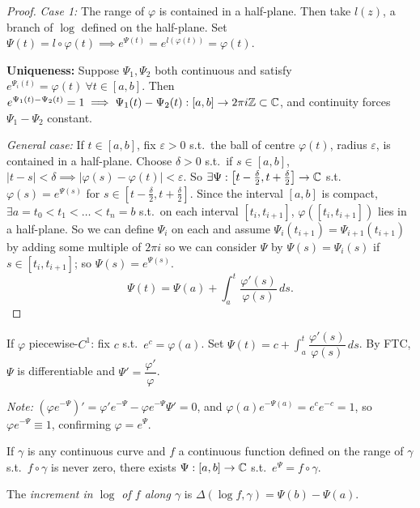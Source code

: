 \documentclass[11pt]{article}
\begin{document}
\begin{proof}
\emph{Case 1:} The range of $\varphi$ is contained in a half-plane. Then take $l(z)$, a branch of $\log$ defined on the half-plane. Set $\Psi(t) = l\circ\varphi(t) \implies e^{\Psi(t)} = e^{l(\varphi(t))} = \varphi(t)$.

\textbf{Uniqueness:} Suppose $\Psi_1,\Psi_2$ both continuous and satisfy $e^{\Psi_i(t)}=\varphi(t)\ \forall t\in[a,b]$. Then $e^{\Psi_1(t)-\Psi_2(t)}=1 \implies \Psi_1(t)-\Psi_2(t) : [a,b]\to 2\pi i{\mathbb{Z}}\subset{\mathbb{C}}$, and continuity forces $\Psi_1-\Psi_2$ constant.

\emph{General case:} If $t\in[a,b]$, fix $\varepsilon>0$ s.t.\ the ball of centre $\varphi(t)$, radius $\varepsilon$, is contained in a half-plane. Choose $\delta>0$ s.t.\ if $s\in[a,b]$, $|t-s|<\delta \implies |\varphi(s)-\varphi(t)|<\varepsilon$. So $\exists \Psi:\left[t-\frac\delta2,t+\frac\delta2\right]\to{\mathbb{C}}$ s.t.\ $\varphi(s)=e^{\Psi(s)}$ for $s\in\left[t-\frac\delta2,t+\frac\delta2\right]$. Since the interval $[a,b]$ is compact, $\exists a=t_0<t_1<\dots<t_n=b$ s.t.\ on each interval $[t_i,t_{i+1}]$, $\varphi([t_i,t_{i+1}])$ lies in a half-plane. So we can define $\Psi_i$ on each and assume $\Psi_i(t_{i+1})=\Psi_{i+1}(t_{i+1})$ by adding some multiple of $2\pi i$ so we can consider $\Psi$ by $\Psi(s)=\Psi_i(s)$ if $s\in[t_i,t_{i+1}]$; so $\Psi(s)=e^{\Psi(s)}$.
\[
\Psi(t)=\Psi(a)+\int_a^t \frac{\varphi'(s)}{\varphi(s)}\,ds.
\]
\end{proof}

\begin{example}
If $\varphi$ piecewise-$C^1$: fix $c$ s.t.\ $e^c=\varphi(a)$. Set $\Psi(t) = c+\int_a^t \dfrac{\varphi'(s)}{\varphi(s)}\,ds$. By FTC, $\Psi$ is differentiable and $\Psi'=\dfrac{\varphi'}{\varphi}$.

\emph{Note:} $\left(\varphi e^{-\Psi}\right)' = \varphi'e^{-\Psi} - \varphi e^{-\Psi}\Psi' = 0$, and $\varphi(a)e^{-\Psi(a)}=e^ce^{-c}=1$, so $\varphi e^{-\Psi}\equiv1$, confirming $\varphi=e^\Psi$.
\end{example}

If $\gamma$ is any continuous curve and $f$ a continuous function defined on the range of $\gamma$ s.t.\ $f\circ\gamma$ is never zero, there exists $\Psi:[a,b]\to{\mathbb{C}}$ s.t.\ $e^\Psi = f\circ\gamma$.

\begin{definition}
The \emph{increment in $\log$ of $f$ along $\gamma$} is $\Delta(\log f,\gamma) = \Psi(b)-\Psi(a)$.
\end{definition}
\end{document}
